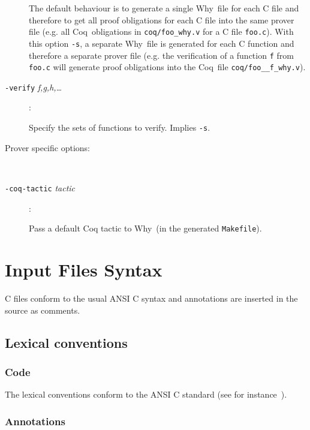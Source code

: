 \documentclass[12pt,a4paper,twoside,openright]{report}
\makeatletter
\newcommand{\coq}{\textsf{Coq}\index{Coq@\textsf{Coq}}}
\newcommand{\why}{\textsf{Why}}
\makeatother
\begin{document}
\begin{description}
    The default behaviour is to generate a single \why\ file 
    for each C file and therefore to get all proof obligations for
    each C file into the same prover file (e.g. all \coq\ obligations
    in \texttt{coq/foo\_why.v} for a C file \texttt{foo.c}).
    With this option \texttt{-s}, a separate \why\ file is generated
    for each C function and therefore a separate prover file
    (e.g. the verification of a function \texttt{f} from
    \texttt{foo.c} will generate proof obligations into the \coq\ file
    \texttt{coq/foo\_\_f\_why.v}).
  \item[\texttt{-verify} \textit{f,g,h,\dots}]: ~\par
    Specify the sets of functions to verify. Implies \texttt{-s}.

  \item[Prover specific options:] ~\par
  \item[\texttt{-coq-tactic} \textit{tactic}]: ~\par
    Pass a default Coq tactic to \why\ (in the generated \texttt{Makefile}).

\end{description}

\section{Input Files Syntax}
\label{syntax}

C files conform to the usual ANSI C
syntax and annotations are inserted in the source as comments.

\subsection{Lexical conventions}
\label{lexical:c}

\subsubsection{Code}

The lexical conventions conform to the ANSI C standard (see
for instance~\cite{KR88}).

\subsubsection{Annotations}
\end{document}
